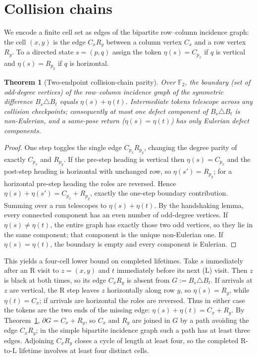 \documentclass[11pt,reqno]{amsart}
\theoremstyle{plain}
\newtheorem{theorem}{Theorem}[section]
\theoremstyle{definition}
\newcommand{\F}{\mathbb{F}}
\newcommand{\turnR}{\mathrm{R}}
\newcommand{\turnL}{\mathrm{L}}
\begin{document}
\section{Collision chains}\label{sec:interlace}

We encode a finite cell set as edges of the bipartite row--column incidence graph:
the cell $(x,y)$ is the edge $C_xR_y$ between a column vertex $C_x$ and a row vertex
$R_y$. To a directed state $s=(p,q)$ assign the token $\eta(s)=C_{p_x}$ if $q$ is
vertical and $\eta(s)=R_{p_y}$ if $q$ is horizontal.

\begin{theorem}[Two-endpoint collision-chain parity]\label{thm:collision}
Over $\F_2$, the boundary (set of odd-degree vertices) of the row--column incidence
graph of the symmetric difference $B_s\triangle B_t$ equals $\eta(s)+\eta(t)$.
Intermediate tokens telescope across any collision checkpoints; consequently at most
one defect component of $B_s\triangle B_t$ is non-Eulerian, and a same-pose return
($\eta(s)=\eta(t)$) has only Eulerian defect components.
\end{theorem}

\begin{proof}
One step toggles the single edge $C_{p_x}R_{p_y}$, changing the degree parity of
exactly $C_{p_x}$ and $R_{p_y}$. If the pre-step heading is vertical then
$\eta(s)=C_{p_x}$ and the post-step heading is horizontal with unchanged row, so
$\eta(s')=R_{p_y}$; for a horizontal pre-step heading the roles are reversed. Hence
$\eta(s)+\eta(s')=C_{p_x}+R_{p_y}$, exactly the one-step boundary contribution.
Summing over a run telescopes to
$\eta(s)+\eta(t)$. By the handshaking lemma, every connected component has an even
number of odd-degree vertices. If $\eta(s)\ne\eta(t)$, the entire graph has exactly
those two odd vertices, so they lie in the same component; that component is the
unique non-Eulerian one. If $\eta(s)=\eta(t)$, the boundary is empty and every
component is Eulerian.
\end{proof}

This yields a four-cell lower bound on completed lifetimes. Take $s$ immediately after
an $\turnR$ visit to $z=(x,y)$ and $t$ immediately before its next ($\turnL$) visit.
Then $z$ is black at both times, so its edge $C_xR_y$ is absent from $G:=B_s\triangle
B_t$. If arrivals at $z$ are vertical, the $\turnR$ step leaves $z$ horizontally
along row $y$, so $\eta(s)=R_y$, while $\eta(t)=C_x$; if arrivals are horizontal the
roles are reversed. Thus in either case the tokens are the two ends of the missing
edge: $\eta(s)+\eta(t)=C_x+R_y$. By Theorem~\ref{thm:collision},
$\partial G=C_x+R_y$, so $C_x$ and $R_y$ are joined in $G$ by a path avoiding the edge
$C_xR_y$; in the simple bipartite incidence graph such a path has at least three edges.
Adjoining $C_xR_y$ closes a cycle of length at least four, so the completed
$\turnR$-to-$\turnL$ lifetime involves at least four distinct cells.
\end{document}
